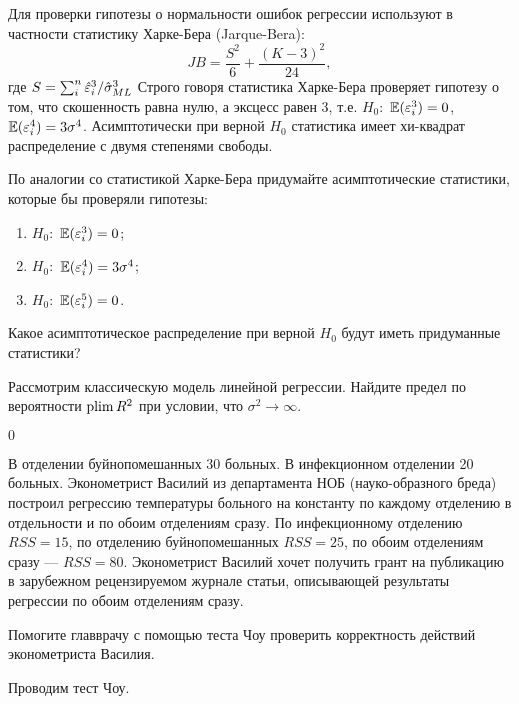 \begin{problem}
Для проверки гипотезы о нормальности ошибок регрессии используют в частности статистику Харке-Бера (Jarque-Bera):
\[
JB=\frac{S^2}{6} + \frac{(K-3)^2}{24},
\]
где $S=\sum_i^n \hat{\varepsilon}_i^3 /\hat{\sigma}^3_{ML}$
Строго говоря статистика Харке-Бера проверяет гипотезу о том, что скошенность равна нулю, а эксцесс равен 3, т.е. $H_0:$ $\mathbb{E}(\varepsilon_i^3)=0$, $\mathbb{E}(\varepsilon_i^4)=3\sigma^4$. Асимптотически при верной $H_0$ статистика имеет хи-квадрат распределение с двумя степенями свободы.

По аналогии со статистикой Харке-Бера придумайте асимптотические статистики, которые бы проверяли гипотезы:
\begin{enumerate}
\item $H_0:$ $\mathbb{E}(\varepsilon_i^3)=0$;
\item $H_0:$ $\mathbb{E}(\varepsilon_i^4)=3\sigma^4$;
\item $H_0:$ $\mathbb{E}(\varepsilon_i^5)=0$.
\end{enumerate}
Какое асимптотическое распределение при верной $H_0$ будут иметь придуманные статистики?

\begin{sol}
\end{sol}
\end{problem}



\begin{problem}
Рассмотрим классическую модель линейной регрессии. Найдите предел по вероятности $\operatorname*{plim} R^2$ при условии, что $\sigma^2 \rightarrow \infty$.

\begin{sol}
$0$
\end{sol}
\end{problem}



\begin{problem}
В отделении буйнопомешанных 30 больных. В инфекционном отделении 20 больных. Эконометрист Василий из департамента НОБ (науко-образного бреда) построил регрессию температуры больного на константу по каждому отделению в отдельности и по обоим отделениям сразу. По инфекционному отделению $RSS=15$, по отделению буйнопомешанных $RSS=25$, по обоим отделениям сразу — $RSS=80$. Эконометрист Василий хочет получить грант на публикацию в зарубежном рецензируемом журнале статьи, описывающей результаты регрессии по обоим отделениям сразу.

Помогите главврачу с помощью теста Чоу проверить корректность действий эконометриста Василия.


\begin{sol}
Проводим тест Чоу.
\end{sol}
\end{problem}



